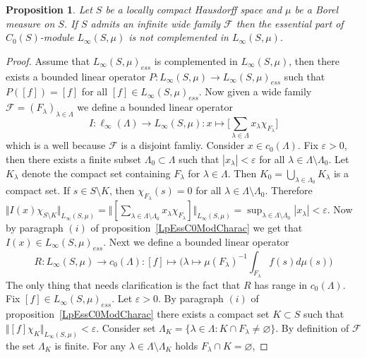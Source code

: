 \documentclass[12pt]{article}
\newtheorem{proposition}[theorem]{Proposition}
\begin{document}
\begin{proposition}\label{LInfEssNotCompl} Let $S$ be a locally compact
    Hausdorff space and $\mu$ be a Borel measure on $S$. If $S$ admits an
    infinite wide family $\mathcal{F}$ then the essential part of
    $C_0(S)$-module $L_\infty(S,\mu)$ is not complemented in $L_\infty(S,\mu)$.
\end{proposition}
\begin{proof} Assume that ${L_\infty(S,\mu)}_{ess}$ is complemented in
    $L_\infty(S,\mu)$, then there exists a bounded linear operator
    $P:L_\infty(S,\mu)\to {L_\infty(S,\mu)}_{ess}$ such that $P([f])=[f]$ for
    all $[f]\in {L_\infty(S,\mu)}_{ess}$. Now given a wide family
    $\mathcal{F}={(F_\lambda)}_{\lambda\in\Lambda}$ we define a bounded linear
    operator
    $$
        I:\ell_\infty(\Lambda)\to L_\infty(S,\mu):
        x\mapsto\biggl[\sum_{\lambda\in\Lambda}x_\lambda \chi_{F_\lambda}\biggr]
    $$
    which is a well because $\mathcal{F}$ is a disjoint famliy. Consider $x\in
        c_0(\Lambda)$. Fix $\varepsilon > 0$, then there exists a finite subset
    $\Lambda_0\subset\Lambda$ such that $|x_\lambda|<\varepsilon$ for all
    $\lambda\in\Lambda\setminus\Lambda_0$. Let $K_\lambda$ denote the
    compact set containing $F_\lambda$ for $\lambda\in\Lambda$. Then
    $K_0=\bigcup_{\lambda\in\Lambda_0}K_\lambda$ is a compact set. If $s\in
        S\setminus K$, then $\chi_{F_\lambda}(s)=0$ for all
    $\lambda\in\Lambda\setminus\Lambda_0$. Therefore $\Vert
        I(x)\chi_{S\setminus K}\Vert_{L_\infty(S,\mu)}
        =\Vert[\sum_{\lambda\in\Lambda\setminus\Lambda_0}x_\lambda\chi_{F_\lambda}]
        \Vert_{L_\infty(S,\mu)}
        =\sup_{\lambda\in\Lambda\setminus\Lambda_0}|x_\lambda|<\varepsilon$. Now
    by paragraph $(i)$ of proposition~\ref{LpEssC0ModCharac} we get that
    $I(x)\in {L_\infty(S,\mu)}_{ess}$. Next we define a bounded linear
    operator
    $$
        R:L_\infty(S,\mu)\to c_0(\Lambda):
        [f]\mapsto \biggl(
        \lambda\mapsto{\mu(F_\lambda)}^{-1}\int_{F_\lambda} f(s)d\mu(s)
        \biggr)
    $$
    The only thing that needs clarification is the fact that $R$ has range in
    $c_0(\Lambda)$. Fix $[f]\in {L_\infty(S,\mu)}_{ess}$. Let $\varepsilon>0$.
    By paragraph $(i)$ of proposition~\ref{LpEssC0ModCharac} there exists a
    compact set $K\subset S$ such that $\Vert
        [f]\chi_{K}\Vert_{L_\infty(S,\mu)}<\varepsilon$. Consider set
    $\Lambda_K=\{\lambda\in\Lambda: K\cap F_\lambda\neq\varnothing \}$. By
    definition of $\mathcal{F}$ the set $\Lambda_K$ is finite. For any
    $\lambda\in\Lambda\setminus \Lambda_K$ holds $F_\lambda\cap K=\varnothing$,

\end{proof}
\end{document}
